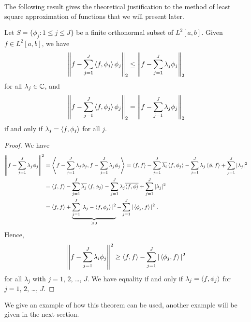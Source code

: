 The following result gives the theoretical justification to the method of
least square approximation of functions that we will present later.

\begin{theorem}
Let $\displaystyle S = \{\phi_j : 1 \leq j \leq J\}$ be a finite
orthonormal subset of $L^2[a,b]$.  Given $ f\in L^2[a,b]$, we have
\[
\left\| f - \sum_{j=1}^J \left\langle{f} , {\phi_j}\right\rangle \phi_j \right\|_2
\leq \left\| f - \sum_{j=1}^J \lambda_j \phi_j \right\|_2
\]
for all $\lambda_j \in \mathbb{C}$, and
\[
\left\| f - \sum_{j=1}^J \left\langle{f} , {\phi_j}\right\rangle \phi_j \right\|_2
= \left\| f - \sum_{j=1}^J \lambda_j \phi_j \right\|_2
\]
if and only if $\lambda_j = \left\langle{f} , {\phi_j}\right\rangle$ for all $j$.
\label{appr_finiteS}
\end{theorem}

\begin{proof}
We have
\begin{align*}
\left\| f - \sum_{j=1}^J \lambda_j \phi_j \right\|^2 &=
\left\langle{f - \sum_{j=1}^J \lambda_j\phi_j} , {f - \sum_{j=1}^J \lambda_j\phi_j}\right\rangle
= \left\langle{f} , {f}\right\rangle - \sum_{j=1}^J \overline{\lambda_i}\left\langle{f} , {\phi_j}\right\rangle
- \sum_{j=1}^J \lambda_j\left\langle{\phi} , {f}\right\rangle + \sum_{_j=1}^J |\lambda_j|^2 \\
&= \left\langle{f} , {f}\right\rangle - \sum_{j=1}^J \overline{\lambda_j}\left\langle{f} , {\phi_j}\right\rangle
- \sum_{j=1}^J \lambda_j \overline{\left\langle{f} , {\phi}\right\rangle}
+ \sum_{j=1}^J |\lambda_j|^2 \\
&= \left\langle{f} , {f}\right\rangle
+ \underbrace{\sum_{j=1}^J |\lambda_j - \left\langle{f} , {\phi_j}\right\rangle|^2}_{\geq 0} -
\sum_{j=1}^J |\left\langle{\phi_j} , {f}\right\rangle|^2 \ .
\end{align*}
Hence,
\[
\left\| f - \sum_{j=1}^J \lambda_i \phi_j \right\|^2 \geq
\left\langle{f} , {f}\right\rangle- \sum_{j=1}^J |\left\langle{\phi_j} , {f}\right\rangle|^2
\]
for all $\lambda_j$ with $j=1$, $2$, \ldots, $J$.  We have equality if
and only if $\lambda_j = \left\langle{f} , {\phi_j}\right\rangle$ for $j=1$, $2$, \ldots, $J$.
\end{proof}

We give an example of how this theorem can be used, another example will be
given in the next section.


